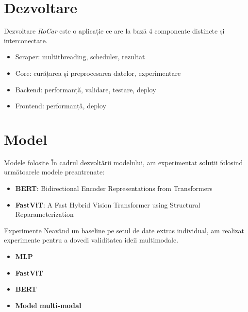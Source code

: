 \documentclass[aspectratio=169]{beamer}
\begin{document}
\section{Dezvoltare}

\begin{frame}{Dezvoltare}
    \emph{RoCar} este o aplicație ce are la bază 4 componente distincte și interconectate.

    \begin{itemize}
        \item Scraper: multithreading, scheduler, rezultat %
        \item Core: curățarea și preprocesarea datelor, experimentare %
        \item Backend: performanță, validare, testare, deploy %
        \item Frontend: performanță, deploy
    \end{itemize}
    
\end{frame}

\section{Model}

\begin{frame}{Modele folosite}
    În cadrul dezvoltării modelului, am experimentat soluții folosind următoarele modele preantrenate:
    \begin{itemize}
        \item \textbf{BERT}: Bidirectional Encoder Representations from Transformers
        \item \textbf{FastViT}: A Fast Hybrid Vision Transformer using Structural Reparameterization
    \end{itemize}

\end{frame}

\begin{frame}{Experimente}
    Neavând un baseline pe setul de date extras individual, am realizat experimente pentru a dovedi validitatea ideii multimodale.

    \begin{itemize}
        \item \textbf{MLP}
        \item \textbf{FastViT}
        \item \textbf{BERT}
        \item \textbf{Model multi-modal}
    \end{itemize}

\end{frame}
\end{document}
